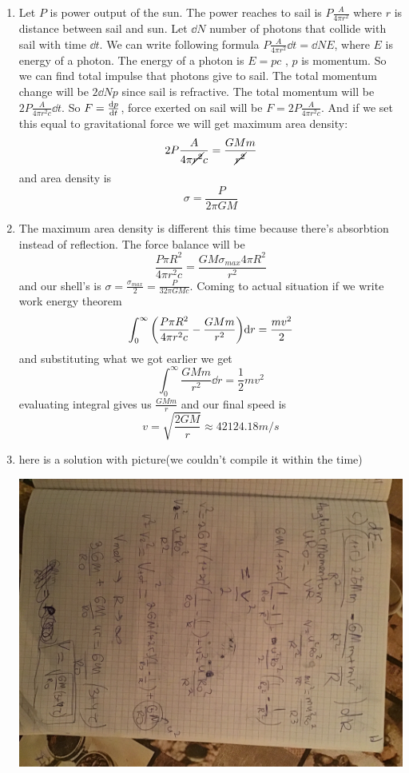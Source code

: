 \begin{sol}
\begin{enumerate}[label=\textbf{(\alph*)}]
\item
Let $P$ is power output of the sun. The power reaches to sail is $P\frac{A}{4\pi r^2}$ where $r$ is distance between sail and sun.
Let $\dd N$ number of photons that collide with sail with time $\dd t$. We can write following formula $P\frac{A}{4\pi r^2}\dd t=\dd N E$, where $E$ is energy of a photon. The energy of a photon is $E=pc$ , $p$ is momentum.
So we can find total impulse that photons give to sail. The total momentum change will be $2\dd Np$ since sail is refractive. The total momentum will be $2P\frac{A}{4\pi r^2c}\dd t$. So $F=\dv{p}{t}$, force exerted on sail will be $F=2P\frac{A}{4\pi r^2c}$. And if we set this equal to
gravitational force we will get maximum area density: $$2P\frac{A}{4\pi \cancel{r^2}c}=\frac{GMm}{\cancel{r^2}}$$ and area density is $$\sigma=\frac{P}{2\pi GM}$$
\item
The maximum area density is different this time because there's absorbtion instead of reflection. The force balance will be $$\frac{P\pi R^2}{4\pi r^2c}=\frac{GM\sigma_{max}4\pi R^2}{r^2}$$ and our shell's is 
$\sigma=\frac{\sigma_{max}}{2}=\frac{P}{32\pi GMc}$. Coming to actual situation if we write work energy theorem $$\int_0^\infty \qty(\frac{P\pi R^2}{4\pi r^2c}-\frac{GMm}{r^2})\dd r=\frac{mv^2}{2}$$ and substituting what we got earlier we
get $$\int_0^\infty\frac{GMm}{r^2}\dd r=\frac12mv^2$$ evaluating integral gives us $\frac{GMm}{r}$ and our final speed is $$v=\sqrt{\frac{2GM}{r}}\approx 42124.18 m/s$$
\item here is a solution with picture(we couldn't compile it within the time)
\newline
\newline
\begin{center}
    \includegraphics[width=\columnwidth, angle=90]{question2_partC.jpg}

\end{center}
\end{enumerate}
\end{sol}
